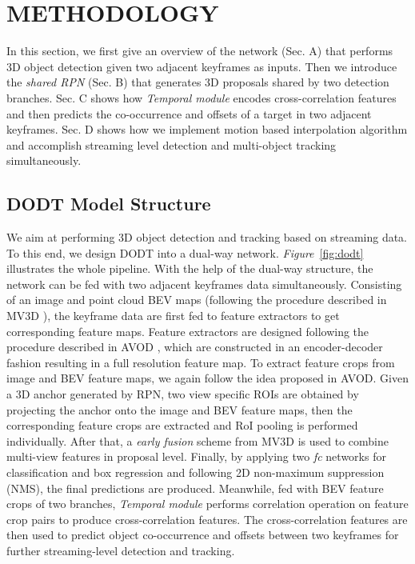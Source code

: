 \documentclass[letterpaper, 10pt, conference]{ieeeconf}  %
\def\figurename{\emph{Figure}}
\begin{document}
\section{METHODOLOGY}

In this section, we first give an overview of the network (Sec. A) that performs 3D object detection given two adjacent keyframes as inputs. Then we introduce the \textit{shared RPN} (Sec. B) that generates 3D proposals shared by two detection branches. Sec. C shows how \textit{Temporal module} encodes cross-correlation features and then predicts the co-occurrence and offsets of a target in two adjacent keyframes. Sec. D shows how we implement motion based interpolation algorithm and accomplish streaming level detection and multi-object tracking simultaneously.

\subsection{DODT Model Structure} 
We aim at performing 3D object detection and tracking based on streaming data. To this end, we design DODT into a dual-way network. \figurename \, \ref{fig:dodt} illustrates the whole pipeline. With the help of the dual-way structure, the network can be fed with two adjacent keyframes data simultaneously. Consisting of an image and point cloud BEV maps (following the procedure described in MV3D \cite{chen2017multi}), the keyframe data are first fed to feature extractors to get corresponding feature maps. Feature extractors are designed following the procedure described in AVOD \cite{ku2018joint}, which are constructed in an encoder-decoder fashion resulting in a full resolution feature map. To extract feature crops from image and BEV feature maps, we again follow the idea proposed in AVOD. Given a 3D anchor generated by RPN, two view specific ROIs are obtained by projecting the anchor onto the image and BEV feature maps, then the corresponding feature crops are extracted and RoI pooling is performed individually. After that, a \textit{early fusion} scheme from MV3D \cite{chen2017multi} is used to combine multi-view features in proposal level. Finally, by applying two \textit{fc} networks for classification and box regression and following 2D non-maximum suppression (NMS), the final predictions are produced. Meanwhile, fed with BEV feature crops of two branches, \textit{Temporal module} performs correlation operation on feature crop pairs to produce cross-correlation features. The cross-correlation features are then used to predict object co-occurrence and offsets between two keyframes for further streaming-level detection and tracking.
\end{document}
